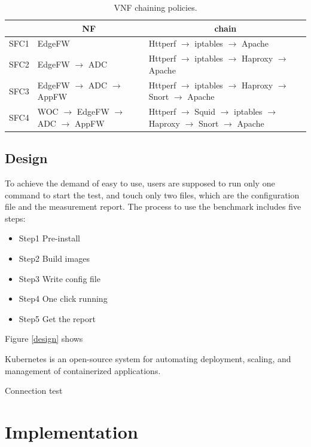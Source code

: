 \documentclass{sig-alternate-10pt}
\begin{document}
\begin{table}[!t]
\newcommand{\tabincell}[2]{\begin{tabular}{@{}#1@{}}#2\end{tabular}}
\centering
\begin{tabular}{|l|l|l|}\hline
\textbf{} & \multicolumn{1}{c|}{\textbf{NF}} & \multicolumn{1}{c|}{\textbf{chain}} \\\hline
SFC1 & EdgeFW & Httperf $\to$ iptables $\to$ Apache \\\hline
SFC2 & EdgeFW $\to$ ADC & Httperf $\to$ iptables $\to$ Haproxy $\to$ Apache \\\hline
SFC3 & EdgeFW $\to$ ADC $\to$ AppFW & Httperf $\to$ iptables $\to$ Haproxy $\to$ Snort $\to$ Apache \\\hline
SFC4 & WOC $\to$ EdgeFW $\to$ ADC $\to$ AppFW & Httperf $\to$  Squid $\to$ iptables $\to$ Haproxy $\to$ Snort $\to$ Apache \\\hline
\end{tabular}
\caption{VNF chaining policies.}
\label{nfs}
\end{table}




\subsection{Design}
To achieve the demand of easy to use, 
users are supposed to run only one command to start the test, 
and touch only two files, 
which are the configuration file and the measurement report. 
The process to use the benchmark includes five steps:
\begin{itemize}
\item[]{}Step1 Pre-install 
\item[]{}Step2 Build images
\item[]{}Step3 Write config file
\item[]{}Step4 One click running
\item[]{}Step5 Get the report
\end{itemize}



Figure \ref{design} shows 


Kubernetes is an open-source system for automating deployment, scaling, and management of containerized applications.

Connection test



\section{Implementation}
\end{document}
